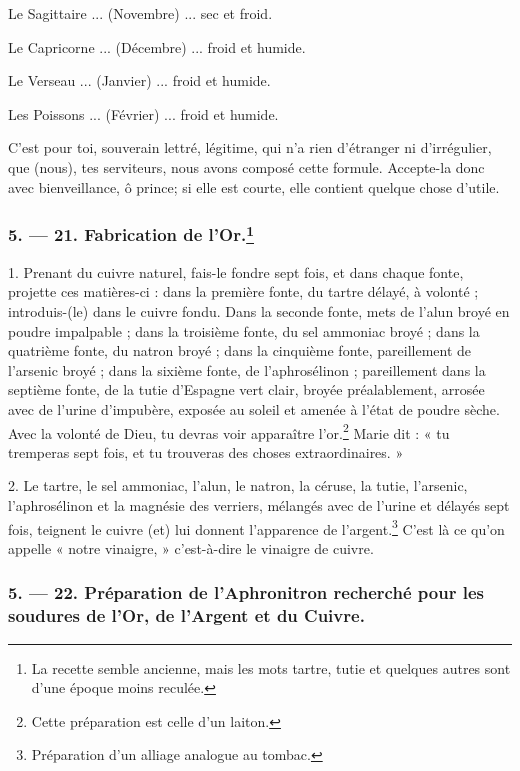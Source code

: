 \documentclass[a4paper, 11pt, oneside, polutonikogreek, french]{article}
\begin{document}
Le Sagittaire ... (Novembre) ... sec et froid.

Le Capricorne ... (Décembre) ... froid et humide.

Le Verseau ... (Janvier) ... froid et humide.

Les Poissons ... (Février) ... froid et humide.

C'est pour toi, souverain lettré, légitime, qui n'a rien d'étranger ni d'irrégulier, que (nous), tes serviteurs, nous avons composé cette formule. Accepte-la donc avec bienveillance, ô prince; si elle est courte, elle contient quelque chose d'utile.

\bigskip
\centerline{\EightStarTaper}
\centerline{\EightStarTaper\EightStarTaper}
\bigskip

\subsubsection[5. --- 21. Fabrication de l'Or.]{5. --- 21. Fabrication de l'Or.\footnote{La recette semble ancienne, mais les mots tartre, tutie et quelques autres sont d'une époque moins reculée.}}

1. Prenant du cuivre naturel, fais-le fondre sept fois, et dans chaque fonte, projette ces matières-ci : dans la première fonte, du tartre délayé, à volonté ; introduis-(le) dans le cuivre fondu. Dans la seconde fonte, mets de l'alun broyé en poudre impalpable ; dans la troisième fonte, du sel ammoniac broyé ; dans la quatrième fonte, du natron broyé ; dans la cinquième fonte, pareillement de l'arsenic broyé ; dans la sixième fonte, de l'aphrosélinon ; pareillement dans la septième fonte, de la tutie d'Espagne vert clair, broyée préalablement, arrosée avec de l'urine d'impubère, exposée au soleil et amenée à l'état de poudre sèche. Avec la volonté de Dieu, tu devras voir apparaître l'or.\footnote{Cette préparation est celle d'un laiton.} Marie dit : « tu tremperas sept fois, et tu trouveras des choses extraordinaires. »

2. Le tartre, le sel ammoniac, l'alun, le natron, la céruse, la tutie, l'arsenic, l'aphrosélinon et la magnésie des verriers, mélangés avec de l'urine et délayés sept fois, teignent le cuivre (et) lui donnent l'apparence de l'argent.\footnote{Préparation d'un alliage analogue au tombac.} C'est là ce qu'on appelle « notre vinaigre, » c'est-à-dire le vinaigre de cuivre.

\bigskip
\centerline{\EightStarTaper}
\centerline{\EightStarTaper\EightStarTaper}
\bigskip

\subsubsection{5. --- 22. Préparation de l'Aphronitron recherché pour les soudures de l'Or, de l'Argent et du Cuivre.}
\end{document}
